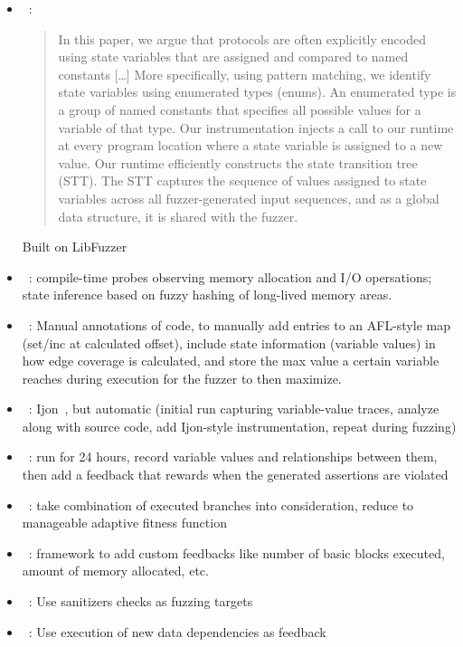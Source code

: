 \documentclass{article}
\let\savedCite=\cite
\renewcommand{\cite}{\unskip~\savedCite}
\begin{document}
\begin{itemize}
    \item {}\cite{StatefulGreybox}: \begin{quote}
              In this paper, we argue that protocols are often explicitly encoded using state variables that are assigned and compared to named constants […] More
              specifically, using pattern matching, we identify state variables using enumerated types (enums). An enumerated type is a group of named constants that specifies all possible values for a variable of that type. Our instrumentation injects a call to our runtime at every program location where a state variable is assigned to a new value. Our runtime efficiently constructs the state transition tree (STT). The STT captures the sequence of values assigned to state variables across all fuzzer-generated input sequences, and as a global data structure, it is shared with the fuzzer.
          \end{quote}
          Built on LibFuzzer
    \item {}\cite{StateAFL}: compile-time probes observing memory allocation and I/O opersations; state inference based on fuzzy hashing of long-lived memory areas.
    \item {}\cite{Ijon}: Manual annotations of code, to manually add entries to an AFL-style map (set/inc at calculated offset), include state information (variable values) in how edge coverage is calculated, and store the max value a certain variable reaches during execution for the fuzzer to then maximize.
    \item {}\cite{SandPuppy}: Ijon\cite{Ijon}, but automatic (initial run capturing variable-value traces, analyze along with source code, add Ijon-style instrumentation, repeat during fuzzing)
    \item {}\cite{INVSCOV}: run for 24 hours, record variable values and relationships between them, then add a feedback that rewards when the generated assertions are violated
    \item {}\cite{Ankou}: take combination of executed branches into consideration, reduce to manageable adaptive fitness function
    \item {}\cite{FuzzFactory}: framework to add custom feedbacks like number of basic blocks executed, amount of memory allocated, etc.
    \item {}\cite{ParmeSan}: Use sanitizers checks as fuzzing targets
    \item {}\cite{DDFuzz}: Use execution of new data dependencies as feedback
\end{itemize}
\end{document}
